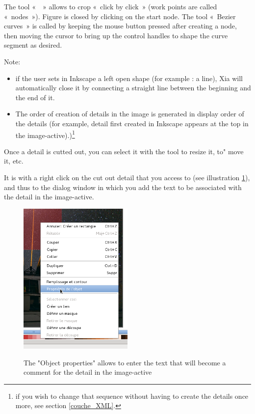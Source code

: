 The tool «~~» 
allows to crop «~click by click~» (work points are called 
«~nodes~»).  Figure is closed by clicking on the start node. 
The tool «~Bezier curves~» is called by keeping the mouse button pressed 
after creating a node, then moving the cursor to bring up the control handles 
to shape the curve segment as desired.

Note:
\begin{itemize}
 \item if the user sets in Inkscape a left open shape (for
example : a line), Xia will automatically close it  by connecting a 
 straight line between the beginning and the end of it.
 \item The order of creation of details in the image is generated in display 
order of the details (for example, detail first created in
Inkscape appears at the top in the image-active).)\footnote{if you wish to 
change that sequence without having to create the details once more, see 
section 
\ref{couche_XML}.}
\end{itemize}

Once a detail is cutted out, you can select it with the tool  
 to resize it, to" 
move it, etc.

It is with a right click on the cut out detail that you access to 
 (see illustration 
\ref{proprietes_objet}), and 
thus to the dialog window in which you add the text to be associated with the 
detail in the image-active.

\begin{figure}[htp]
 \centering
 \caption{The "Object properties" allows to enter the text that will become a 
 comment for the detail in the image-active}
 \includegraphics[width=0.5\textwidth]{./images/proprietes_objet}
 \label{proprietes_objet}
\end{figure}

